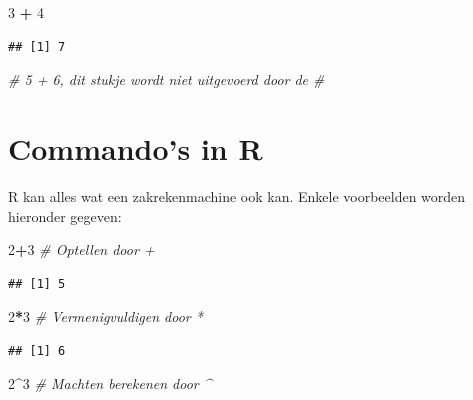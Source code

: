 \documentclass[
]{book}
\newenvironment{Shaded}{\begin{snugshade}}{\end{snugshade}}
\newcommand{\CommentTok}[1]{\textcolor[rgb]{0.56,0.35,0.01}{\textit{#1}}}
\newcommand{\DecValTok}[1]{\textcolor[rgb]{0.00,0.00,0.81}{#1}}
\newcommand{\SpecialCharTok}[1]{\textcolor[rgb]{0.81,0.36,0.00}{\textbf{#1}}}
\begin{document}
\begin{Shaded}
\begin{Highlighting}[]
\DecValTok{3} \SpecialCharTok{+} \DecValTok{4}
\end{Highlighting}
\end{Shaded}

\begin{verbatim}
## [1] 7
\end{verbatim}

\begin{Shaded}
\begin{Highlighting}[]
\CommentTok{\# 5 + 6, dit stukje wordt niet uitgevoerd door de \textquotesingle{}\#\textquotesingle{}}
\end{Highlighting}
\end{Shaded}

\hypertarget{commandos-in-r}{%
\chapter{Commando's in R}\label{commandos-in-r}}

R kan alles wat een zakrekenmachine ook kan. Enkele voorbeelden worden hieronder gegeven:

\begin{Shaded}
\begin{Highlighting}[]
\DecValTok{2}\SpecialCharTok{+}\DecValTok{3} \CommentTok{\# Optellen door \textquotesingle{}+\textquotesingle{}}
\end{Highlighting}
\end{Shaded}

\begin{verbatim}
## [1] 5
\end{verbatim}

\begin{Shaded}
\begin{Highlighting}[]
\DecValTok{2}\SpecialCharTok{*}\DecValTok{3} \CommentTok{\# Vermenigvuldigen door \textquotesingle{}*\textquotesingle{}}
\end{Highlighting}
\end{Shaded}

\begin{verbatim}
## [1] 6
\end{verbatim}

\begin{Shaded}
\begin{Highlighting}[]
\DecValTok{2}\SpecialCharTok{\^{}}\DecValTok{3} \CommentTok{\# Machten berekenen door \textquotesingle{}\^{}\textquotesingle{}}
\end{Highlighting}
\end{Shaded}
\end{document}
